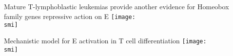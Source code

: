 \documentclass[10pt]{beamer}
\def\smi{out/ln/updir/mw-gcthesis-oral/library.bib}
\begin{document}
\begin{frame}{Mature T-lymphoblastic leukemias provide another evidence for Homeobox family genes repressive action on E\textalpha{}}
  \def\smi{out/ln/updir/mw-gcthesis-oral/ink/tall/ealpha_h3k27ac_groups.pdf}
  \texttt{[image: \\smi]}%
\end{frame}
\begin{frame}{Mechanistic model for E\textalpha{} activation in T cell differentiation}
  \def\smi{out/ln/updir/mw-gcthesis-oral/ink/Highlight_HOXA_Blueprint_paper.pdf}
  \texttt{[image: \\smi]}%
\end{frame}
\end{document}
